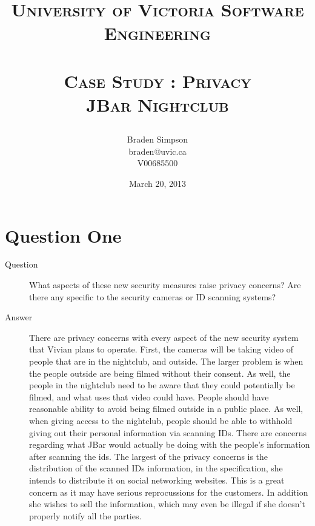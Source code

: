 \documentclass{article}
\title{
\large{\textsc{University of Victoria Software Engineering}}\huge\\ [0pt] %
\horrule{0.5pt}\\[0.4cm]
\textsc{Case Study : Privacy\\JBar Nightclub}\\
\author{Braden Simpson\\braden@uvic.ca\\V00685500}
\date{March 20, 2013}
}
\numberwithin{equation}{section} %
\numberwithin{figure}{section} %
\numberwithin{table}{section} %
\begin{document}
\maketitle %


\section{Question One}
\label{sec:one}

\begin{description}
	\item[Question] What aspects of these new security measures raise privacy concerns? Are there any specific to the security cameras or ID scanning systems?
	\item[Answer] There are privacy concerns with every aspect of the new security system that Vivian plans to operate.  First, the cameras will be taking video of people that are in the nightclub, and outside.  The larger problem is when the people outside are being filmed without their consent.  As well, the people in the nightclub need to be aware that they could potentially be filmed, and what uses that video could have.  People should have reasonable ability to avoid being filmed outside in a public place.  As well, when giving access to the nightclub, people should be able to withhold giving out their personal information via scanning IDs.  There are concerns regarding what JBar would actually be doing with the people's information after scanning the ids.  The largest of the privacy concerns is the distribution of the scanned IDs information, in the specification, she intends to distribute it on social networking websites.  This is a great concern as it may have serious reprocussions for the customers.  In addition she wishes to sell the information, which may even be illegal if she doesn't properly notify all the parties.  
\end{description}
\end{document}
